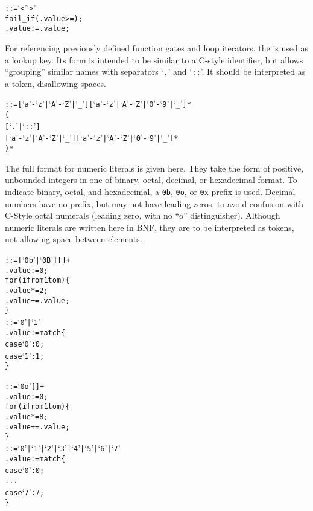 \begin{appendices}
\begin{alltt}\ttSyn
   ::= `<'  `>'\ttSem
    fail_if(.value >= );
    .value := .value;
\end{alltt}

For referencing previously defined function gates and loop iterators, the  is used as a lookup key.
Its form is intended to be similar to a C-style identifier, but allows ``grouping'' similar names with separators `\texttt{.}' and `\texttt{::}'.
It should be interpreted as a token, disallowing spaces.\\

\begin{alltt}\ttSyn
   ::= [`a'-`z' | `A'-`Z' | `_']  [`a'-`z' | `A'-`Z' | `0'-`9' | `_']*
           (
              [`.' | `::']
              [`a'-`z' | `A'-`Z' | `_']  [`a'-`z' | `A'-`Z' | `0'-`9' | `_']*
           )*
\end{alltt}

The full format for numeric literals is given here.
They take the form of positive, unbounded integers in one of binary, octal, decimal, or hexadecimal format.
To indicate binary, octal, and hexadecimal, a \texttt{0b}, \texttt{0o}, or \texttt{0x} prefix is used.
Decimal numbers have no prefix, but may not have leading zeros, to avoid confusion with C-Style octal numerals (leading zero, with no ``o'' distinguisher).
Although numeric literals are written here in BNF, they are to be interpreted as tokens, not allowing space between elements.\\

\begin{alltt}\ttSyn
   ::= [ `0b' | `0B' ] [  ]+\ttSem
    .value := 0;
    for(i from 1 to m) \{
      .value *= 2;
      .value += .value;
    \}\ttSyn
   ::= `0' | `1'\ttSem
    .value := match \{
      case `0': 0;
      case `1': 1;
    \}\ttSyn

   ::= `0o' [  ]+\ttSem
    .value := 0;
    for(i from 1 to m) \{
      .value *= 8;
      .value += .value;
    \}\ttSyn
   ::= `0' | `1' | `2' | `3' | `4' | `5' | `6' | `7'\ttSem
    .value := match \{
      case `0': 0;
      ...
      case `7': 7;
    \}\ttSyn



\end{alltt}
\end{appendices}
